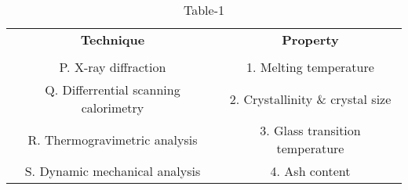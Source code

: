 \begin{table}[htbp]
  \centering
  \caption{Table-1}
  \label{table1}
  \begin{tabular}{cc}
  \textbf{Technique} & \textbf{Property} \\ \\
    P. X-ray diffraction & 1. Melting temperature \\
    Q. Differrential scanning calorimetry & 2. Crystallinity \& crystal size \\
    R. Thermogravimetric analysis & 3. Glass transition temperature \\
    S. Dynamic mechanical analysis & 4. Ash content \\
    
  \end{tabular}
\end{table}